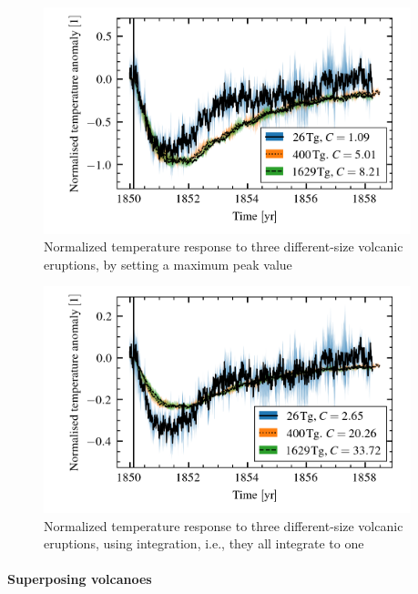\documentclass{ametsocV5}
\begin{document}
\begin{figure}
  \begin{center}
    \includegraphics[width=0.95\textwidth]{figures/compare-waveform-max.png}
  \end{center}
  \caption{Normalized temperature response to three different-size volcanic eruptions,
    by setting a maximum peak value}
  \label{fig:temp_norm_max}
\end{figure}

\begin{figure}
  \begin{center}
    \includegraphics[width=0.95\textwidth]{figures/compare-waveform-integrate.png}
  \end{center}
  \caption{Normalized temperature response to three different-size volcanic eruptions,
    using integration, i.e., they all integrate to one}
  \label{fig:temp_norm_int}
\end{figure}

\paragraph*{Superposing volcanoes}
\end{document}
